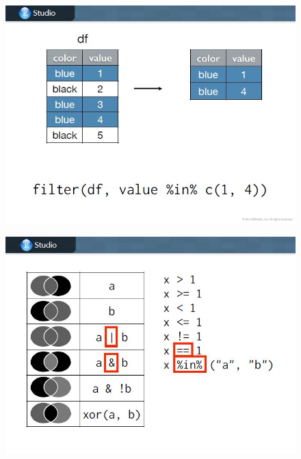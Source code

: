 \documentclass{beamer}
\begin{document}
\begin{frame}
	\begin{figure}
		\centering
		\includegraphics[width=1.05\linewidth]{images/CG-dplyr10}
	\end{figure}
\end{frame}
\begin{frame}
	\begin{figure}
		\centering
		\includegraphics[width=1.05\linewidth]{images/CG-dplyr11}
	\end{figure}
\end{frame}
\end{document}
